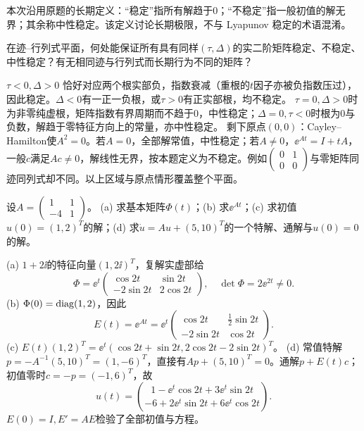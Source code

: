 本次沿用原题的长期定义：“稳定”指所有解趋于0；“不稳定”指一般初值的解无界；其余称中性稳定。该定义讨论长期极限，不与 Lyapunov 稳定的术语混淆。
\begin{exercise}\label{cw:rec24-1}
在迹--行列式平面，何处能保证所有具有同样$(\tau,\Delta)$的实二阶矩阵稳定、不稳定、中性稳定？有无相同迹与行列式而长期行为不同的矩阵？
\end{exercise}
\begin{solution}
$\tau<0,\Delta>0$ 恰好对应两个根实部负，指数衰减（重根的$t$因子亦被负指数压过），因此稳定。$\Delta<0$有一正一负根，或$\tau>0$有正实部根，均不稳定。
$\tau=0,\Delta>0$时为非零纯虚根，矩阵指数有界周期而不趋于0，中性稳定；$\Delta=0,\tau<0$时根为0与负数，解趋于零特征方向上的常量，亦中性稳定。
剩下原点$(0,0)$：Cayley--Hamilton使$A^2=0$。若$A=0$，全部解常值，中性稳定；若$A\ne0$，$\ee^{At}=I+tA$，一般$c$满足$Ac\ne0$，解线性无界，按本题定义为不稳定。例如$\begin{pmatrix}0&1\\0&0\end{pmatrix}$与零矩阵同迹同列式却不同。以上区域与原点情形覆盖整个平面。
\par{}
\end{solution}

\begin{exercise}\label{cw:rec24-2}
设$A=\begin{pmatrix}1&1\\-4&1\end{pmatrix}$。
(a) 求基本矩阵$\Phi(t)$；(b) 求$\ee^{At}$；(c) 求初值$u(0)=(1,2)^T$的解；(d) 求$\dot u=Au+(5,10)^T$的一个特解、通解与$u(0)=0$的解。
\end{exercise}
\begin{solution}
(a) $1+2\ii$的特征向量$(1,2\ii)^T$，复解实虚部给
\[\Phi=\ee^t\begin{pmatrix}\cos2t&\sin2t\\-2\sin2t&2\cos2t\end{pmatrix},\quad\det\Phi=2\ee^{2t}\ne0.\]
(b) $\Phi(0)=\operatorname{diag}(1,2)$，因此
\[E(t)=\ee^{At}=\ee^t\begin{pmatrix}\cos2t&\frac12\sin2t\\-2\sin2t&\cos2t\end{pmatrix}.\]
(c) $E(t)(1,2)^T=\ee^t(\cos2t+\sin2t,2\cos2t-2\sin2t)^T$。
(d) 常值特解$p=-A^{-1}(5,10)^T=(1,-6)^T$，直接有$Ap+(5,10)^T=0$。通解$p+E(t)c$；初值零时$c=-p=(-1,6)^T$，故
\[u(t)=\binom{1-\ee^t\cos2t+3\ee^t\sin2t}{-6+2\ee^t\sin2t+6\ee^t\cos2t}.\]
$E(0)=I,E'=AE$检验了全部初值与方程。
\par{}
\end{solution}

